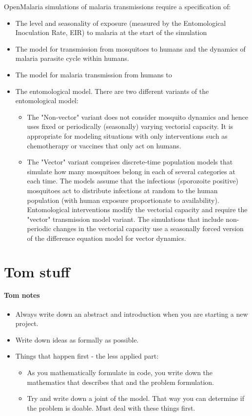 \documentclass[]{scrartcl}
\begin{document}
\begin{itemize}
OpenMalaria simulations of malaria transmissions require a specification of:
\begin{itemize}
	\item The level and seasonality of exposure (measured by the Entomological Inoculation Rate, EIR) to malaria at the start of the simulation
	\item The model for transmission from mosquitoes to humans and the dynamics of malaria parasite cycle within humans.
	\item The model for malaria transmission from humans to 
	\item The entomological model. There are two different variants of the entomological model:
	\begin{itemize}
    \item The "Non-vector" variant does not consider mosquito dynamics and hence uses fixed or periodically (seasonally) varying vectorial capacity. It is appropriate for modeling situations with only interventions such as chemotherapy or vaccines that only act on humans.
	\item The "Vector" variant comprises discrete-time population models that simulate how many mosquitoes belong in each of several categories at each time. The models assume that the infectious (sporozoite positive) mosquitoes act to distribute infections at random to the human population (with human exposure proportionate to availability). Entomological interventions modify the vectorial capacity and require the "vector" transmission model variant. The simulations that include non-periodic changes in the vectorial capacity use a seasonally forced version of the difference equation model for vector dynamics.
\end{itemize}
\end{itemize}

\section{Tom stuff}

\paragraph*{Tom notes}

\begin{itemize}
	\item Always write down an abstract and introduction when you are starting a new project. 
	\item Write down ideas as formally as possible. 
	\item Things that happen first - the less applied part: 
	\begin{itemize}
		\item As you mathematically formulate in code, you write down the mathematics that describes that and the problem formulation. 
         \item Try and write down a joint of the model. That way you can determine if the problem is doable. Must deal with these things first. 
\end{itemize}
\end{itemize}


\end{itemize}
\end{document}

